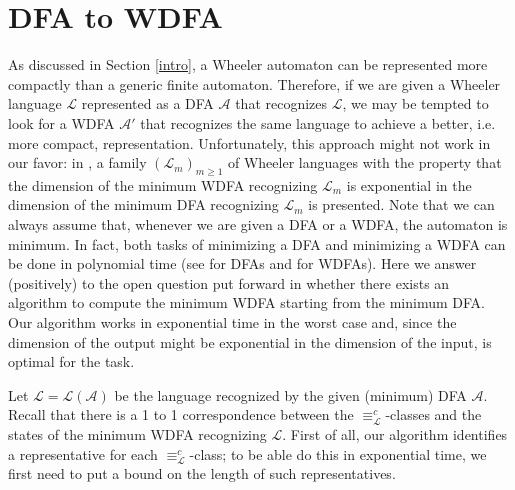 \documentclass[runningheads]{llncs}
\newcommand{\la}[1]{\mathcal L(\mathcal #1)}
\begin{document}
\section{DFA to WDFA}

As discussed in Section \ref{intro}, a Wheeler automaton can be represented more compactly than a generic finite automaton. Therefore, if we are given a Wheeler language $\mathcal L$ represented as a DFA $\mathcal A$ that recognizes $\mathcal L$, we may be tempted to look for a WDFA $\mathcal A'$ that recognizes the same language to achieve a better, i.e. more compact, representation. 
Unfortunately, this approach might not work in our favor: in \cite{ADPP}, a family $(\mathcal L_m)_{m\ge1}$ of Wheeler languages with the property that the dimension of the minimum WDFA recognizing $\mathcal L_m$ is exponential in the dimension of the minimum DFA recognizing $\mathcal L_m$ is presented. 
Note that we can always assume that, whenever we are given a DFA or a WDFA, the automaton is minimum. In fact, both tasks of minimizing a DFA and minimizing a WDFA can be done in polynomial time (see \cite{Hop} for DFAs and \cite{ADPP} for WDFAs).
Here we answer (positively) to the open question put forward in \cite{ADPP} whether there exists an algorithm to compute the minimum WDFA starting from the minimum DFA. Our algorithm works in exponential time in the worst case and, since the dimension of the output might be exponential in the dimension of the input, is optimal for the task. 

Let $\mathcal L = \la A$ be the language recognized by the given (minimum) DFA $\mathcal A$. Recall that there is a 1 to 1 correspondence between the $\equiv_\mathcal L^c$-classes and the states of the minimum WDFA recognizing $\mathcal L$. 
First of all, our algorithm identifies a representative for each $\equiv_\mathcal L^c$-class; to be able do this in exponential time, we first need to put a bound on the length of such representatives.
\end{document}
